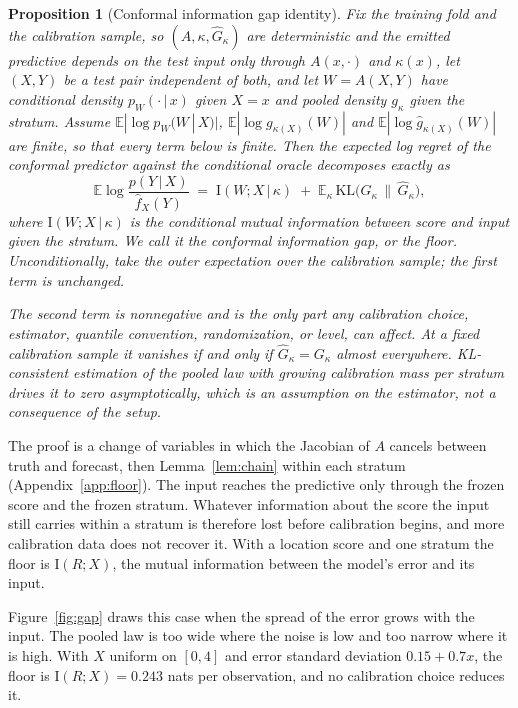 \documentclass[11pt]{article}
\newtheorem{proposition}{Proposition}
\theoremstyle{remark}
\newcommand{\E}{\mathbb{E}}
\newcommand{\I}{\mathrm{I}}
\newcommand{\given}{\,|\,}
\newcommand{\KLop}{\mathrm{KL}}
\begin{document}
\begin{proposition}[Conformal information gap identity]\label{prop:floor}
Fix the training fold and the calibration sample, so $(A,\kappa,\widehat
G_\kappa)$ are deterministic and the emitted predictive depends on the test input only
through $A(x,\cdot)$ and $\kappa(x)$, let $(X,Y)$ be a test pair independent of both,
and let $W=A(X,Y)$ have conditional density $p_W(\cdot\given x)$ given $X=x$ and
pooled density $g_\kappa$ given the stratum. Assume $\E|\log p_W(W\given X)|$,
$\E|\log g_{\kappa(X)}(W)|$ and $\E|\log\widehat g_{\kappa(X)}(W)|$ are finite, so that
every term below is finite. Then the expected log regret of the conformal predictor
against the conditional oracle decomposes exactly as
\[
\E\log\frac{p(Y\given X)}{\widehat f_X(Y)}
\;=\; \I(W;X\given\kappa)
\;+\; \E_{\kappa}\,\KLop\!\big(G_{\kappa}\,\|\,\widehat G_{\kappa}\big),
\]
where $\I(W;X\given\kappa)$ is the conditional mutual information between score
and input given the stratum. We call it the conformal information gap, or the floor. Unconditionally, take the outer expectation over the calibration sample; the first term is unchanged.

The second term is
nonnegative and is the only part any calibration choice, estimator, quantile
convention, randomization, or level, can affect. At a fixed calibration sample
it vanishes if and only if $\widehat G_\kappa=G_\kappa$ almost everywhere.
KL-consistent estimation of the pooled law with growing calibration mass per
stratum drives it to zero asymptotically, which is an assumption on the
estimator, not a consequence of the setup.
\end{proposition}

The proof is a change of variables in which the Jacobian of $A$ cancels between
truth and forecast, then Lemma~\ref{lem:chain} within each stratum
(Appendix~\ref{app:floor}). The input reaches the predictive only through the
frozen score and the frozen stratum. Whatever information about the score the
input still carries within a stratum is therefore lost before calibration begins,
and more calibration data does not recover it. With
a location score and one stratum the floor is $\I(R;X)$, the mutual information
between the model's error and its input.

Figure~\ref{fig:gap} draws this case when the spread of the error grows with the
input. The pooled law is too wide where the noise is low and too narrow where it is
high. With $X$ uniform on $[0,4]$ and error standard deviation $0.15+0.7x$, the floor
is $\I(R;X)=0.243$ nats per observation, and no calibration choice reduces it.
\end{document}
